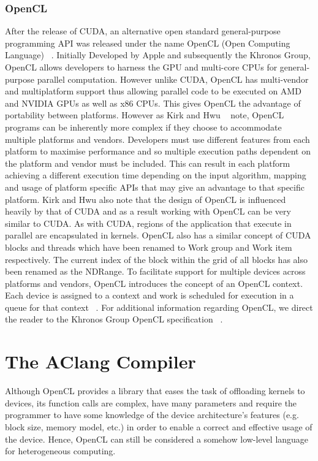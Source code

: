 \documentclass[Ingles]{ic-tese-v1}
\begin{document}
\subsubsection{OpenCL}

After the release of CUDA, an alternative open standard general-purpose programming
API was released under the name OpenCL (Open Computing Language) ~\cite{Kirk:2012}.
Initially Developed by Apple and subsequently the Khronos Group, OpenCL allows
developers to harness the GPU and multi-core CPUs for general-purpose parallel
computation. However unlike CUDA, OpenCL has multi-vendor and multiplatform
support thus allowing parallel code to be executed on AMD and NVIDIA GPUs
as well as x86 CPUs. This gives OpenCL the advantage of portability between
platforms. However as Kirk and Hwu ~\cite{Kirk:2012} note, OpenCL programs can be inherently more complex if they choose to accommodate multiple platforms and vendors.
Developers must use different features from each platform to maximise performance
and so multiple execution paths dependent on the platform and vendor must be
included. This can result in each platform achieving a different execution time
depending on the input algorithm, mapping and usage of platform specific APIs
that may give an advantage to that specific platform. Kirk and Hwu also note
that the design of OpenCL is influenced heavily by that of CUDA and as a result
working with OpenCL can be very similar to CUDA. As with CUDA, regions of
the application that execute in parallel are encapsulated in kernels. OpenCL also
has a similar concept of CUDA blocks and threads which have been renamed to
Work group and Work item respectively. The current index of the block within the
grid of all blocks has also been renamed as the NDRange. To facilitate support for
multiple devices across platforms and vendors, OpenCL introduces the concept of
an OpenCL context. Each device is assigned to a context and work is scheduled
for execution in a queue for that context ~\cite{Kirk:2012}. For additional information regarding OpenCL, we direct the reader to the Khronos Group OpenCL specification ~\cite{opencl}.

\section{The AClang Compiler}
\label{sec:AClang}

Although OpenCL provides  a library that eases the  task of offloading
kernels  to  devices,  its  function  calls  are  complex,  have  many
parameters and  require the programmer  to have some knowledge  of the
device architecture's  features (e.g. block size,  memory model, etc.)
in order to enable a correct and effective usage of the device. Hence,
OpenCL  can  still  be  considered a  somehow  low-level  language  for
heterogeneous computing.
\end{document}

